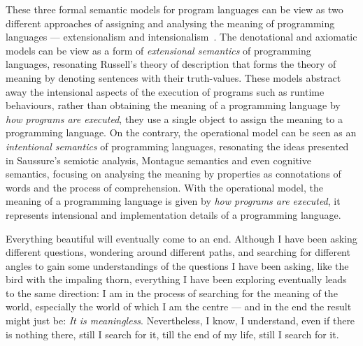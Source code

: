 \begin{highlightnew}
These three formal semantic models for program languages can be view as two different approaches of assigning and analysing the meaning of programming languages --- extensionalism and intensionalism~\citep{viva}. The denotational and axiomatic models can be view as a form of \emph{extensional semantics} of programming languages, resonating Russell's theory of description that forms the theory of meaning by denoting sentences with their truth-values. These models abstract away the intensional aspects of the execution of programs such as runtime behaviours, rather than obtaining the meaning of a programming language by \emph{how programs are executed}, they use a single object to assign the meaning to a programming language. On the contrary, the operational model can be seen as an \emph{intentional semantics} of programming languages, resonating the ideas presented in Saussure's semiotic analysis, Montague semantics and even cognitive semantics, focusing on analysing the meaning by properties as connotations of words and the process of comprehension. With the operational model, the meaning of a programming language is given by \emph{how programs are executed}, it represents intensional and implementation details of a programming language.
\end{highlightnew}



\begin{center}
\vspace{-0.7em}
\vspace{-0.3em}
\end{center}

Everything beautiful will eventually come to an end. Although I have been asking different questions, wondering around different paths, and searching for different angles to gain some understandings of the questions I have been asking, like the bird with the impaling thorn, everything I have been exploring eventually leads to the same direction: I am in the process of searching for the meaning of the world, especially the world of which I am the centre --- and in the end the result might just be: \emph{It is meaningless}. Nevertheless, I know, I understand, even if there is nothing there, still I search for it, till the end of my life, still I search for it.